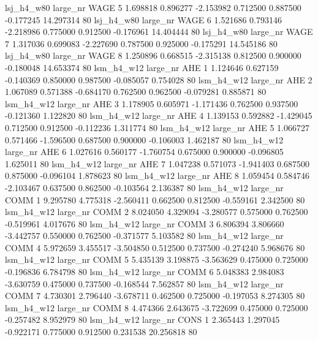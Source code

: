   lsj_h4_w80   large_nr     WAGE                 5  1.698818  0.896277  -2.153982 0.712500 0.887500 -0.177245   14.297314 80
  lsj_h4_w80   large_nr     WAGE                 6  1.521686  0.793146  -2.218986 0.775000 0.912500 -0.176961   14.404444 80
  lsj_h4_w80   large_nr     WAGE                 7  1.317036  0.699083  -2.227690 0.787500 0.925000 -0.175291   14.545186 80
  lsj_h4_w80   large_nr     WAGE                 8  1.250896  0.668515  -2.315138 0.812500 0.900000 -0.180048   14.653374 80
  lsm_h4_w12   large_nr      AHE                 1  1.124646  0.627159  -0.140369 0.850000 0.987500 -0.085057    0.754028 80
  lsm_h4_w12   large_nr      AHE                 2  1.067089  0.571388  -0.684170 0.762500 0.962500 -0.079281    0.885871 80
  lsm_h4_w12   large_nr      AHE                 3  1.178905  0.605971  -1.171436 0.762500 0.937500 -0.121360    1.122820 80
  lsm_h4_w12   large_nr      AHE                 4  1.139153  0.592882  -1.429045 0.712500 0.912500 -0.112236    1.311774 80
  lsm_h4_w12   large_nr      AHE                 5  1.066727  0.571466  -1.596500 0.687500 0.900000 -0.106003    1.462187 80
  lsm_h4_w12   large_nr      AHE                 6  1.027616  0.560177  -1.760754 0.675000 0.900000 -0.096805    1.625011 80
  lsm_h4_w12   large_nr      AHE                 7  1.047238  0.571073  -1.941403 0.687500 0.875000 -0.096104    1.878623 80
  lsm_h4_w12   large_nr      AHE                 8  1.059454  0.584746  -2.103467 0.637500 0.862500 -0.103564    2.136387 80
  lsm_h4_w12   large_nr     COMM                 1  9.295780  4.775318  -2.560411 0.662500 0.812500 -0.559161    2.342500 80
  lsm_h4_w12   large_nr     COMM                 2  8.024050  4.329094  -3.280577 0.575000 0.762500 -0.519961    4.017676 80
  lsm_h4_w12   large_nr     COMM                 3  6.806394  3.806660  -3.442757 0.550000 0.762500 -0.371577    5.103582 80
  lsm_h4_w12   large_nr     COMM                 4  5.972659  3.455517  -3.504850 0.512500 0.737500 -0.274240    5.968676 80
  lsm_h4_w12   large_nr     COMM                 5  5.435139  3.198875  -3.563629 0.475000 0.725000 -0.196836    6.784798 80
  lsm_h4_w12   large_nr     COMM                 6  5.048383  2.984083  -3.630759 0.475000 0.737500 -0.168544    7.562857 80
  lsm_h4_w12   large_nr     COMM                 7  4.730301  2.796440  -3.678711 0.462500 0.725000 -0.197053    8.274305 80
  lsm_h4_w12   large_nr     COMM                 8  4.474366  2.643675  -3.722699 0.475000 0.725000 -0.257482    8.952979 80
  lsm_h4_w12   large_nr     CONS                 1  2.365443  1.297045  -0.922171 0.775000 0.912500  0.231538   20.256818 80

